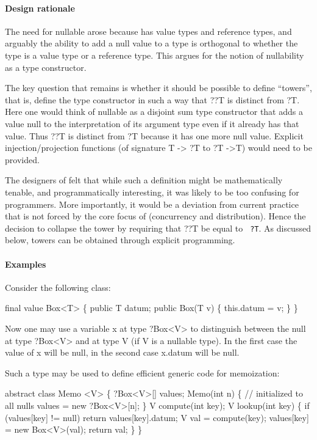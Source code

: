 \paragraph{Design rationale}

The need for nullable arose because \Xten{} has value types and
reference types, and arguably the ability to add a {\cf null} value to a
type is orthogonal to whether the type is a value type or a 
reference type. This argues for the notion of nullability as a type
constructor.

The key question that remains is whether it should be possible to
define ``towers'', that is, define the type constructor in such a way
that {\cf ??T} is distinct from {\cf ?T}. Here one would think of
nullable as a disjoint sum type constructor that adds a value {\cf
null} to the interpretation of its argument type even if it already
has that value. Thus {\cf ??T} is distinct from {\cf ?T} because it
has one more {\cf null} value. Explicit injection/projection functions
(of signature {\cf T -> ?T} to {\cf ?T ->T}) would need to be
provided.

The designers of \Xten{} felt that while such a definition might be
mathematically tenable, and programmatically interesting, it was
likely to be too confusing for programmers. More importantly, it would
be a deviation from current practice that is not forced by the core
focus of \Xten{} (concurrency and distribution). Hence the decision to
collapse the tower by requiring that {\cf ??T} be equal to {\tt
?T}. As discussed below, towers can be obtained through explicit
programming.

\paragraph{Examples}

Consider the following class:

\begin{x10}
 final value Box<T> \{ 
   public T datum; 
   public Box(T v) \{ this.datum = v; \}
  \}
\end{x10}

Now one may use a variable {\cf x} at type {\cf ?Box<V>} to
distinguish between the {\cf null} at type {\cf ?Box<V>} and at type
{\cf V} (if {\cf V} is a nullable type). In the first case the value
of {\cf x} will be {\cf null}, in the second case {\cf x.datum} will
be {\cf null}.

Such a type may be used to define efficient generic code for memoization:

\begin{x10}
 abstract class Memo <V> \{
   ?Box<V>[]  values; 
   Memo(int n) \{
     // initialized to all nulls
     values = new ?Box<V>[n]; 
   \}
   V compute(int key); 
   V lookup(int key) \{ 
    if (values[key] != null) 
      return values[key].datum;
    V val = compute(key);
    values[key] = new Box<V>(val);
    return val;
   \}
 \}
\end{x10}



 


